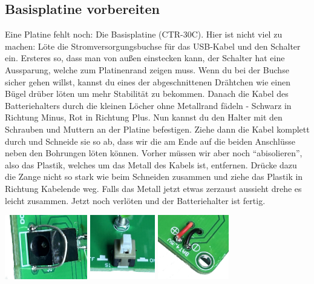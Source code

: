 \documentclass[10pt]{article}
\begin{document}
	\subsection{Basisplatine vorbereiten}
	Eine Platine fehlt noch: Die Basisplatine (CTR-30C). Hier ist nicht viel zu machen: Löte die Stromversorgungsbuchse für das USB-Kabel und den Schalter ein. Ersteres so, dass man von außen einstecken kann, der Schalter hat eine Aussparung, welche zum Platinenrand zeigen muss. Wenn du bei der Buchse sicher gehen willst, kannst du eines der abgeschnittenen Drähtchen wie einen Bügel drüber löten um mehr Stabilität zu bekommen.
	Danach die Kabel des Batteriehalters durch die kleinen Löcher ohne Metallrand fädeln - Schwarz in Richtung Minus, Rot in Richtung Plus. Nun kannst du den Halter mit den Schrauben und Muttern an der Platine befestigen. Ziehe dann die Kabel komplett durch und Schneide sie so ab, dass wir die am Ende auf die beiden Anschlüsse neben den Bohrungen löten können. Vorher müssen wir aber noch \enquote{abisolieren}, also das Plastik, welches um das Metall des Kabels ist, entfernen. Drücke dazu die Zange nicht so stark wie beim Schneiden zusammen und ziehe das Plastik in Richtung Kabelende weg. Falls das Metall jetzt etwas zerzaust aussieht drehe es leicht zusammen. Jetzt noch verlöten und der Batteriehalter ist fertig.
	\begin{center}
		\includegraphics[height=2.8cm]{dc.png}
		\includegraphics[height=2.8cm]{sw.png}
		\includegraphics[height=2.8cm]{batcbl.png}
	\end{center}
	
\end{document}

